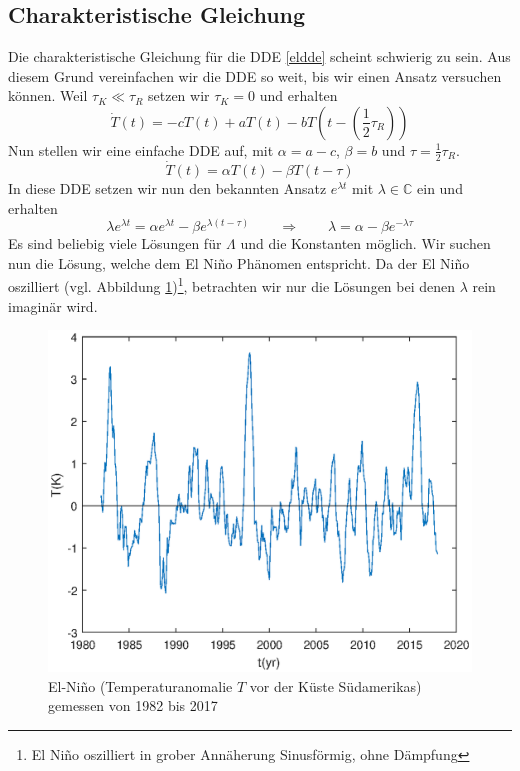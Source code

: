 \subsection{Charakteristische Gleichung}
Die charakteristische Gleichung für die DDE \eqref{eldde} scheint schwierig zu sein. 
Aus diesem Grund vereinfachen wir die DDE so weit, bis wir einen Ansatz versuchen können.
Weil $\tau_K \ll \tau_R$ setzen wir $\tau_K = 0$ und erhalten
\begin{equation}
	\dot{T}(t)=-cT(t)+aT(t)-bT(t-(\frac{1}{2}\tau_R))
\end{equation}
Nun stellen wir eine einfache DDE auf, mit $\alpha = a-c$, $\beta = b$ und $\tau = \frac{1}{2}\tau_R$.
\begin{equation}
	\dot{T}(t)=\alpha T(t)-\beta T(t-\tau)
\end{equation}
In diese DDE setzen wir nun den bekannten Ansatz $e^{\lambda t}$ mit $\lambda \in \mathbb{C}$ ein und erhalten
\begin{equation} \label{char_eldde}
	\lambda e^{\lambda t} = \alpha e^{\lambda t} - \beta e^{\lambda(t-\tau)} \qquad\Rightarrow\qquad \lambda = \alpha-\beta e^{-\lambda \tau}
\end{equation}
Es sind beliebig viele Lösungen für $\Lambda$ und die Konstanten möglich.
Wir suchen nun die Lösung, welche dem El Niño Phänomen entspricht.
Da der El Niño oszilliert (vgl. Abbildung \ref{fig:elnino})\footnote{El Niño oszilliert in grober Annäherung Sinusförmig, ohne Dämpfung}, betrachten wir nur die Lösungen bei denen $\lambda$ rein imaginär wird.
\begin{figure}
	\centering
	\includegraphics{verzoegert/inp/figures/elnino.eps}
	\caption{El-Niño (Temperaturanomalie $T$ vor der Küste Südamerikas) gemessen von 1982 bis 2017}
	\label{fig:elnino}
\end{figure}
